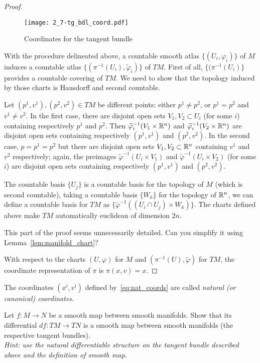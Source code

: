 \begin{proof}
  \begin{figure*}[htp]
    \texttt{[image: 2\_7-tg\_bdl\_coord.pdf]}
    \caption{Coordinates for the tangent bundle}
  \end{figure*}
  
  With the procedure delineated above, a countable smooth atlas $\{(U_i, \varphi_i)\}$ of $M$ induces a countable atlas $\{(\pi^{-1}(U_i), \widetilde\varphi_i)\}$ of $TM$.
  First of all, $\{(\pi^{-1}(U_i)\}$ provides a countable covering of $TM$.
  We need to show that the topology induced by those charts is Hausdorff and second countable.
  
  Let $(p^1, v^1), (p^2, v^2) \in TM$ be different points: either $p^1\neq p^2$, or $p^1 = p^2$ and $v^1 \neq v^2$.
  In the first case, there are disjoint open sets $V_1, V_2 \subset U_i$ (for some $i$) containing respectively $p^1$ and $p^2$.
  Then $\widetilde\varphi_i^{-1}(V_1\times\mathbb{R}^n)$ and $\widetilde\varphi_i^{-1}(V_2\times\mathbb{R}^n)$ are disjoint open sets containing respectively $(p^1, v^1)$ and $(p^2, v^2)$.
  In the second case, $p=p^1=p^2$ but there are disjoint open sets $V_1,V_2\subset \mathbb{R}^n$ containing $v^1$ and $v^2$ respectively;
  again, the preimages $\widetilde\varphi^{-1}(U_i\times V_1)$ and $\widetilde\varphi^{-1}(U_i\times V_2)$ (for some $i$) are disjoint open sets containing respectively $(p^1, v^1)$ and $(p^2, v^2)$.

  The countable basis $\{U_j\}$ is a countable basis for the topology of $M$ (which is second countable), taking a countable basis $\{W_k\}$ for the topology of $\mathbb{R}^n$, we can define a countable basis for $TM$ as $\{\widetilde\varphi^{-1}((U_i\cap U_j)\times W_k)\}$.
  The charts defined above make $TM$ automatically euclidean of dimension $2n$.

  \begin{exercise}
    This part of the proof seems unnecessarily detailed.
    Can you simplify it using Lemma~\ref{lem:manifold_chart}?
  \end{exercise}

   With respect to the charts $(U,\varphi)$ for $M$ and $(\pi^{-1}(U), \widetilde\varphi)$ for $TM$, the coordinate representation of $\pi$ is $\pi(x,v) = x$.
\end{proof}

The coordinates $(x^i, v^i)$ defined by~\eqref{eq:nat_coords} are called \emph{natural (or canonical) coordinates}.

\begin{exercise}
  Let $f:M\to N$ be a smooth map between smooth manifolds.
  Show that its differential $df: TM \to TN$ is a smooth map between smooth manifolds (the respective tangent bundles).\\
  \textit{\small Hint: use the natural differentiable structure on the tangent bundle described above and the definition of smooth map.}
\end{exercise}

